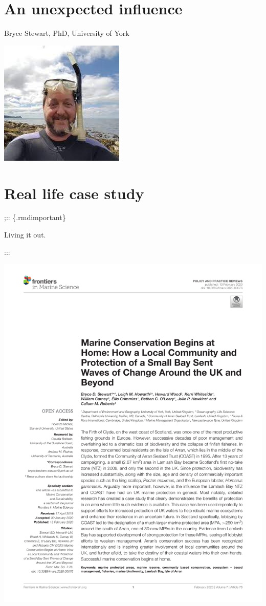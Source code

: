 \documentclass[
]{book}
\begin{document}
\hypertarget{an-unexpected-influence}{%
\chapter{An unexpected influence}\label{an-unexpected-influence}}

Bryce Stewart, PhD, University of York

\begin{center}\includegraphics{_images/bryce} \end{center}

\hypertarget{real-life-case-study}{%
\chapter{Real life case study}\label{real-life-case-study}}

;:: \{.rmdimportant\}

Living it out.

:::

\begin{center}\includegraphics{_images/marine} \end{center}
\end{document}
